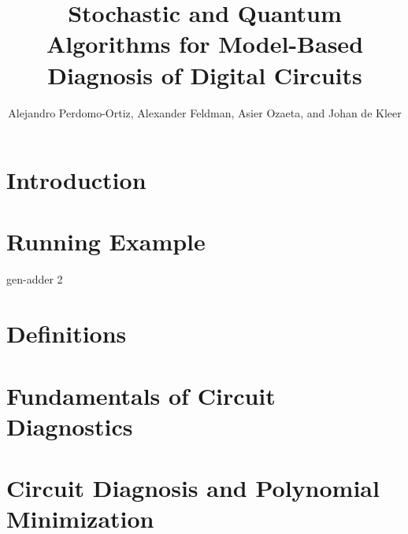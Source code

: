 \documentclass{article}
\title{Stochastic and Quantum Algorithms for Model-Based Diagnosis of Digital Circuits}
\author{Alejandro Perdomo-Ortiz, Alexander Feldman, Asier Ozaeta, and Johan de Kleer}
\begin{document}
\maketitle
\section{Introduction}
\section{Running Example}
gen-adder 2
\section{Definitions}

\begin{definition}
\end{definition}

\begin{definition}
\end{definition}

\begin{definition}[observation]
\end{definition}

\begin{definition}[diagnosis]
\end{definition}

\begin{definition}
\end{definition}

\begin{definition}
\end{definition}

\begin{definition}
\end{definition}

\begin{definition}
\end{definition}

\section{Fundamentals of Circuit Diagnostics}
\section{Circuit Diagnosis and Polynomial Minimization}
\end{document}
